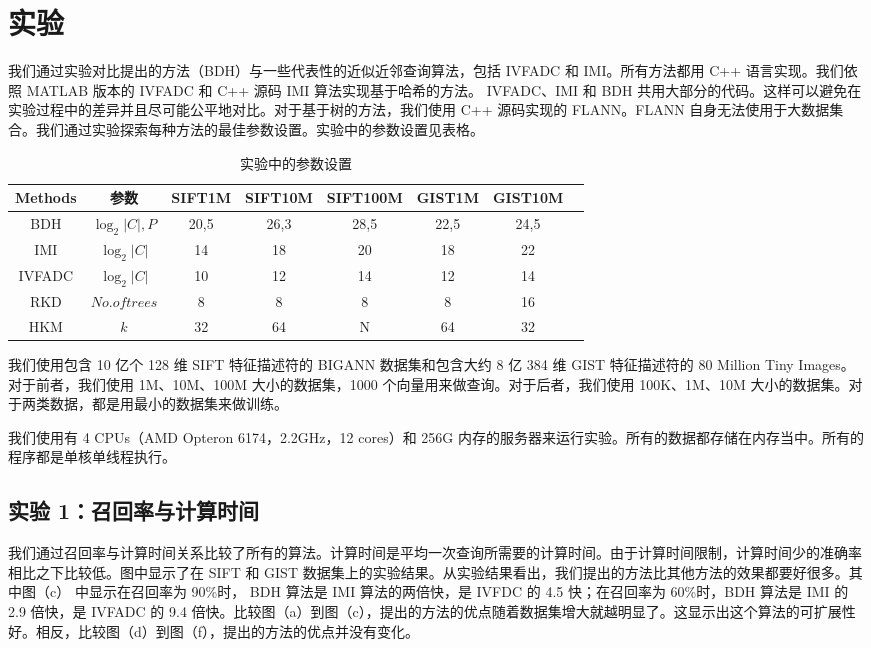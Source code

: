 \section{实验}
我们通过实验对比提出的方法（BDH）与一些代表性的近似近邻查询算法，包括 IVFADC 和 IMI。所有方法都用 C++ 语言实现。我们依照 MATLAB 版本的 IVFADC 和 C++ 源码 IMI 算法实现基于哈希的方法。 IVFADC、IMI 和 BDH 共用大部分的代码。这样可以避免在实验过程中的差异并且尽可能公平地对比。对于基于树的方法，我们使用 C++ 源码实现的 FLANN。FLANN 自身无法使用于大数据集合。我们通过实验探索每种方法的最佳参数设置。实验中的参数设置见表格。
\begin{table}[htbp]
  \centering
  \caption*{实验中的参数设置}
  \label{tab:f_parameters}
  \begin{minipage}[t]{\linewidth}
    \begin{tabular}{|c|c|c|c|c|c|c|c|}
      \hline
        Methods  & 参数 & SIFT1M& SIFT10M& SIFT100M& GIST1M&GIST10M\\
      \hline
      BDH  &  $\log_2|C|,P$& 20,5 & 26,3 & 28,5 & 22,5 & 24,5\\
      \hline
      IMI  &  $\log_2|C|$  & 14 & 18 & 20 & 18 & 22\\
      \hline
   IVFADC  &  $\log_2|C|$  & 10 & 12 & 14 & 12 & 14\\
    \hline
      RKD  &  $No.of trees$& 8  &  8 &  8 &  8 & 16\\
      \hline
      HKM  &  $k$          & 32 & 64 &  N & 64 & 32\\
      \hline
    \end{tabular}
  \end{minipage}
\end{table}
我们使用包含 10 亿个 128 维 SIFT 特征描述符的 BIGANN 数据集和包含大约 8 亿 384 维 GIST 特征描述符的 80 Million Tiny Images。对于前者，我们使用 1M、10M、100M 大小的数据集，1000 个向量用来做查询。对于后者，我们使用 100K、1M、10M 大小的数据集。对于两类数据，都是用最小的数据集来做训练。

我们使用有 4 CPUs（AMD Opteron 6174，2.2GHz，12 cores）和 256G 内存的服务器来运行实验。所有的数据都存储在内存当中。所有的程序都是单核单线程执行。
\subsection{实验 1：召回率与计算时间}
我们通过召回率与计算时间关系比较了所有的算法。计算时间是平均一次查询所需要的计算时间。由于计算时间限制，计算时间少的准确率相比之下比较低。图中显示了在 SIFT 和 GIST 数据集上的实验结果。从实验结果看出，我们提出的方法比其他方法的效果都要好很多。其中图（c） 中显示在召回率为 90\%时， BDH 算法是 IMI 算法的两倍快，是 IVFDC 的 4.5 快；在召回率为 60\%时，BDH 算法是 IMI 的 2.9 倍快，是 IVFADC 的 9.4 倍快。比较图（a）到图（c），提出的方法的优点随着数据集增大就越明显了。这显示出这个算法的可扩展性好。相反，比较图（d）到图（f），提出的方法的优点并没有变化。

